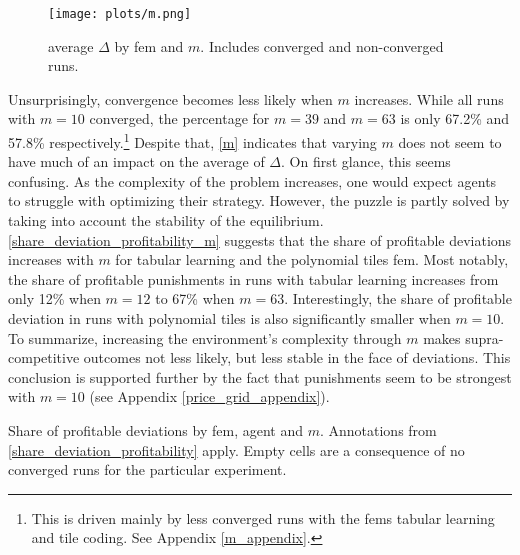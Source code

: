 \begin{figure}
	\texttt{[image: plots/m.png]}
	\caption[average $\Delta$ by \gls{fem} and $m$]{average $\Delta$ by \gls{fem} and $m$. Includes converged and non-converged runs.}
	\label{m}
\end{figure}

Unsurprisingly, convergence becomes less likely when $m$ increases. While all runs with $m=10$ converged, the percentage for $m=39$ and $m=63$ is only  67.2\% and 57.8\% respectively.\footnote{ This is driven mainly by less converged runs with the \gls{fem}s tabular learning and tile coding. See Appendix \ref{m_appendix}.} Despite that, \autoref{m} indicates that varying $m$ does not seem to have much of an impact on the average of $\Delta$. On first glance, this seems confusing. As the complexity of the problem increases, one would expect agents to struggle with optimizing their strategy. However, the puzzle is partly solved by taking into account the stability of the equilibrium. \autoref{share_deviation_profitability_m} suggests that the share of profitable deviations increases with $m$ for tabular learning and the polynomial tiles \gls{fem}. Most notably, the share of profitable punishments in runs with tabular learning increases from only 12\% when $m=12$ to 67\% when $m=63$. Interestingly, the share of profitable deviation in runs with polynomial tiles is also significantly smaller when $m=10$. To summarize, increasing the environment's complexity through $m$ makes supra-competitive outcomes not less likely, but less stable in the face of deviations. This conclusion is supported further by the fact that punishments seem to be strongest with $m = 10$ (see Appendix \ref{price_grid_appendix}).

\begin{table}
	\centering
	
	\caption[Share of profitable deviations by \gls{fem}, agent and $m$]{Share of profitable deviations by \gls{fem}, agent and $m$. Annotations from \autoref{share_deviation_profitability} apply. Empty cells are a consequence of no converged runs for the particular experiment.}
	\label{share_deviation_profitability_m}
\end{table}



